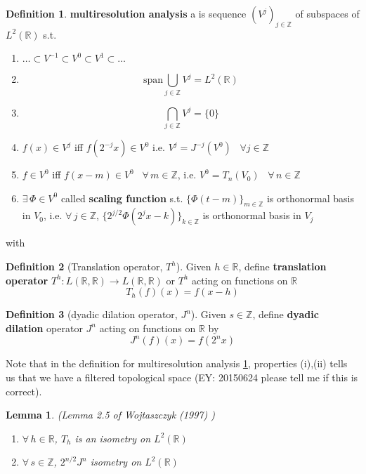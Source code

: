 \documentclass[twoside]{amsart}
\theoremstyle{plain}
\newtheorem{lemma}{Lemma}
\theoremstyle{definition}
\newtheorem{definition}{Definition}
\theoremstyle{remark}
\numberwithin{equation}{section}
\begin{document}
\begin{definition}\label{Def:multiresolutionanalysis}
  \textbf{multiresolution analysis} a is sequence  $(V^j)_{j\in \mathbb{Z}}$ of subspaces of $L^2(\mathbb{R})$ s.t. 
\begin{enumerate}
  \item[(i)] $\dots \subset V^{-1} \subset V^0 \subset V^1 \subset \dots $
  \item[(ii)] \[
\text{span}\bigcup_{j \in \mathbb{Z}} V^j = L^2(\mathbb{R})
\]
  \item[(iii)] 
\[
\bigcap_{j\in \mathbb{Z}} V^j = \lbrace 0 \rbrace
\]
  \item[(iv)] $f(x) \in V^j$ iff $f(2^{-j}x) \in V^0$ i.e. $V^j = J^{-j}(V^0)$ \, $\forall j \in \mathbb{Z}$
  \item[(v)] $f\in V^0$ iff $f(x-m) \in V^0$ \, $\forall \, m \in \mathbb{Z}$,  i.e. $V^0 = T_n(V_0)$ \, $\forall \, n \in \mathbb{Z}$
\item[(vi)] $\exists \, \Phi \in V^0$ called \textbf{scaling function } s.t. $\lbrace \Phi(t-m)\rbrace_{m\in \mathbb{Z}}$ is orthonormal basis in $V_0$, i.e. $\forall \, j \in \mathbb{Z}$, $\lbrace 2^{j/2}\Phi(2^jx-k)\rbrace_{k\in \mathbb{Z}}$ is orthonormal basis in $V_j$
\end{enumerate}
\end{definition}
with
\begin{definition}[Translation operator, $T^h$]
  Given $h\in \mathbb{R}$, define \textbf{translation operator} $T^h: L(\mathbb{R},\mathbb{R}) \to L(\mathbb{R}, \mathbb{R})$ or $T^h$ acting on functions on $\mathbb{R}$
\begin{equation}
  T_h(f)(x) = f(x-h)
\end{equation}
\end{definition}

\begin{definition}[dyadic dilation operator, $J^n$]
Given $s\in \mathbb{Z}$, define \textbf{dyadic dilation} operator $J^n$ acting on functions on $\mathbb{R}$ by 
\begin{equation}
  J^n(f)(x) = f(2^nx)
\end{equation}
\end{definition}
Note that in the definition for multiresolution analysis \ref{Def:multiresolutionanalysis}, properties (i),(ii) tells us that we have a filtered topological space (EY: 20150624 please tell me if this is correct).  

\begin{lemma} (Lemma 2.5 of Wojtaszczyk (1997) \cite{PWojtaszczyk1997})
\begin{enumerate}
  \item[(a)] $\forall \, h \in \mathbb{R}$, $T_h$ is an isometry on $L^2(\mathbb{R})$ 
  \item[(b)] $\forall \, s \in \mathbb{Z}$, $2^{n/2} J^n$ isometry on $L^2(\mathbb{R})$
\end{enumerate}
\end{lemma}
\end{document}
